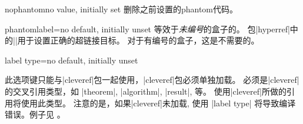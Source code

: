 \begin{docTcbKey}{nophantom}{}{no value, initially set}
删除之前设置的phantom代码。
\end{docTcbKey}
  

  
  \begin{docTcbKey}[][doc new=2014-11-28]{phantomlabel}{=}{no default, initially unset}
  等效于\emph{未编号}的盒子的。%
  包|hyperref|中的||用于设置正确的超链接目标。%
  对于有编号的盒子，这是不需要的。
  \end{docTcbKey}



\begin{docTcbKey}{label type}{=}{no default, initially unset}
  
  此选项键只能与|cleveref|包一起使用，|cleveref|包必须单独加载。%
  必须是|cleveref|的交叉引用类型，如 |theorem|, |algorithm|, |result|, 等。%
  使用|cleveref|所做的引用将使用此类型。%
  注意的是，如果|cleveref|未加载, 使用 |label type| 将导致编译错误。例子见 。
  \end{docTcbKey}
  
